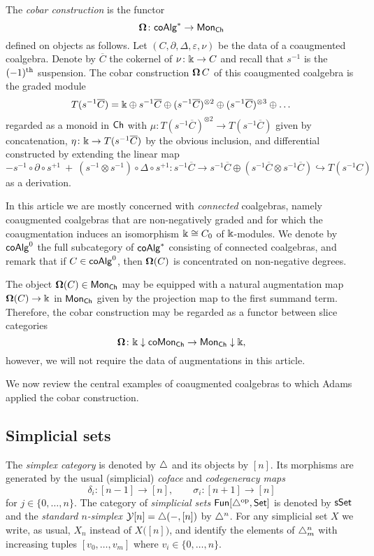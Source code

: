 The \textit{cobar construction} is the functor
\[
\operatorname{\mathbf{\Omega}} \colon \mathsf{coAlg}^\ast \to \mathsf{Mon}_{\mathsf{Ch}}
\]
defined on objects as follows.
Let $(C, \partial, \Delta, \varepsilon, \nu)$ be the data of a coaugmented coalgebra.
Denote by $\overline{C}$ the cokernel of $\nu \colon \Bbbk \to C$ and recall that $s^{-1}$ is the $(-1)^{\mathrm{th}}$ suspension.
The cobar construction $\operatorname{\mathbf{\Omega}} C$ of this coaugmented coalgebra is the graded module
\[
T(s^{-1} \overline{C}) = \Bbbk \oplus s^{-1}\overline{C} \oplus (s^{-1}\overline{C})^{\otimes 2} \oplus (s^{-1}\overline{C})^{\otimes 3} \oplus \dots
\]
regarded as a monoid in $\mathsf{Ch}$ with $\mu \colon T(s^{-1} \overline{C})^{\otimes 2} \to T(s^{-1} \overline{C})$ given by concatenation, $\eta \colon \Bbbk \to T(s^{-1} \overline{C})$ by the obvious inclusion, and differential constructed by extending the linear map
\[
- s^{-1} \circ \partial \circ s^{+1} \ + \ (s^{-1} \otimes s^{-1}) \circ \Delta \circ s^{+1} \colon
s^{-1} \overline{C} \to s^{-1}\overline{C} \oplus (s^{-1}\overline{C} \otimes s^{-1}\overline{C}) \hookrightarrow T(s^{-1}C)
\]
as a derivation.

In this article we are mostly concerned with \textit{connected} coalgebras, namely coaugmented coalgebras that are non-negatively graded and for which the coaugmentation induces an isomorphism $\Bbbk \cong C_0$ of $\Bbbk$-modules.
We denote by $\mathsf{coAlg}^0$ the full subcategory of $\mathsf{coAlg}^\ast$ consisting of connected coalgebras, and remark that if $C \in \mathsf{coAlg}^0$, then $ \operatorname{\mathbf{\Omega}}(C)$ is concentrated on non-negative degrees.

The object $ \operatorname{\mathbf{\Omega}}(C) \in \mathsf{Mon}_{\mathsf{Ch}}$ may be equipped with a natural augmentation map $\operatorname{\mathbf{\Omega}}(C) \to \Bbbk$ in $\mathsf{Mon}_{\mathsf{Ch}}$ given by the projection map to the first summand term. Therefore, the cobar construction may be regarded as a functor between slice categories
\[
\operatorname{\mathbf{\Omega}} \colon \Bbbk \downarrow \mathsf{coMon}_{\mathsf{Ch}} \to \mathsf{Mon}_{\mathsf{Ch}} \downarrow \Bbbk,
\]
however, we will not require the data of augmentations in this article.

We now review the central examples of coaugmented coalgebras to which Adams applied the cobar construction.

\subsection{Simplicial sets}

The \textit{simplex category} is denoted by $\triangle$ and its objects by $[n]$.
Its morphisms are generated by the usual (simplicial) \textit{coface} and \textit{codegeneracy maps}
\[
\delta_i \colon [n-1] \to [n], \qquad \sigma_i \colon [n+1] \to [n]
\]
for $j \in \{0, \dots, n\}$.
The category of \textit{simplicial sets} $\mathsf{Fun}[\triangle^{\mathrm{op}}, \mathsf{Set}]$ is denoted by $\mathsf{sSet}$ and the \textit{standard $n$-simplex} $\operatorname{\mathcal{Y}} [n] = \triangle(-, [n])$ by $\triangle^n$.
For any simplicial set $X$ we write, as usual, $X_n$ instead of $X \big( [n] \big)$, and identify the elements of $\triangle^n_m$ with increasing tuples $[v_0, \dots, v_m]$ where $v_i \in \{0, \dots, n\}$.

